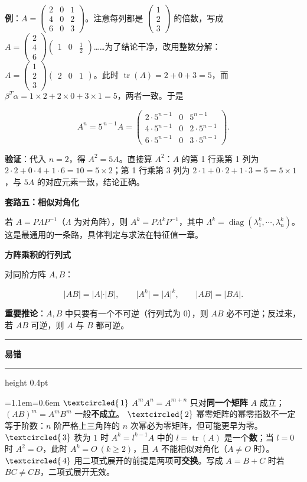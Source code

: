 \documentclass[11pt,openany,UTF8]{ctexbook}
\newcommand{\circled}[1]{\textcircled{\scriptsize\,#1}}
\newcommand{\callouthead}[2]{%
  \par\addvspace{7pt}\noindent
  {\color{#1}\rule[-0.15em]{3pt}{1.05em}}\hspace{0.5em}%
  {\bfseries\color{#1}#2}\par\nobreak\vspace{-0.35em}%
  {\color{rulesep}\hrule height 0.4pt}\nobreak\vspace{0.45em}%
  \begingroup\small\setlength{\parindent}{0pt}%
  \leftskip=1.1em\rightskip=0.6em\noindent\ignorespaces}
\newcommand{\calloutend}{\par\endgroup\addvspace{7pt}}
\newenvironment{callwarn}[1]{\callouthead{warnbar}{#1}}{\calloutend}
\begin{document}
\textbf{例}：$A=\begin{pmatrix}2&0&1\\4&0&2\\6&0&3\end{pmatrix}$。注意每列都是 $\begin{pmatrix}1\\2\\3\end{pmatrix}$ 的倍数，写成 $A=\begin{pmatrix}2\\4\\6\end{pmatrix}\begin{pmatrix}1&0&\frac12\end{pmatrix}$……为了结论干净，改用整数分解：$A=\begin{pmatrix}1\\2\\3\end{pmatrix}\begin{pmatrix}2&0&1\end{pmatrix}$。此时 $\operatorname{tr}(A)=2+0+3=5$，而 $\beta^T\alpha=1\times2+2\times0+3\times1=5$，两者一致。于是

\[A^{n}=5^{\,n-1}A=\begin{pmatrix}2\cdot5^{n-1}&0&5^{n-1}\\4\cdot5^{n-1}&0&2\cdot5^{n-1}\\6\cdot5^{n-1}&0&3\cdot5^{n-1}\end{pmatrix}.\]

\textbf{验证}：代入 $n=2$，得 $A^2=5A$。直接算 $A^2$：$A$ 的第 1 行乘第 1 列为 $2\cdot2+0\cdot4+1\cdot6=10=5\times2$；第 1 行乘第 3 列为 $2\cdot1+0\cdot2+1\cdot3=5=5\times1$，与 $5A$ 的对应元素一致，结论正确。

\textbf{套路五：相似对角化}

若 $A=P\Lambda P^{-1}$（$\Lambda$ 为对角阵），则 $A^k=P\Lambda^kP^{-1}$，其中 $\Lambda^k=\operatorname{diag}(\lambda_1^k,\cdots,\lambda_n^k)$。这是最通用的一条路，具体判定与求法在特征值一章。

\textbf{方阵乘积的行列式}

对同阶方阵 $A,B$：

\[\vert AB\vert=\vert A\vert\cdot\vert B\vert,\qquad \vert A^k\vert=\vert A\vert^k,\qquad \vert AB\vert=\vert BA\vert .\]

\textbf{重要推论}：$A,B$ 中只要有一个不可逆（行列式为 $0$），则 $AB$ 必不可逆；反过来，若 $AB$ 可逆，则 $A$ 与 $B$ 都可逆。

\begin{callwarn}{易错}
$\circled{1}$ $A^mA^n=A^{m+n}$ 只对\textbf{同一个矩阵} $A$ 成立；$(AB)^m=A^mB^m$ 一般\textbf{不成立}。 $\circled{2}$ 幂零矩阵的幂零指数不一定等于阶数：$n$ 阶严格上三角阵的 $n$ 次幂必为零矩阵，但可能更早为零。 $\circled{3}$ 秩为 $1$ 时 $A^k=l^{k-1}A$ 中的 $l=\operatorname{tr}(A)$ 是一个\textbf{数}；当 $l=0$ 时 $A^2=O$，此时 $A^k=O\ (k\ge2)$，且 $A$ 不能相似对角化（$A\ne O$ 时）。 $\circled{4}$ 用二项式展开的前提是两项\textbf{可交换}。写成 $A=B+C$ 时若 $BC\ne CB$，二项式展开无效。

\end{callwarn}
\end{document}
